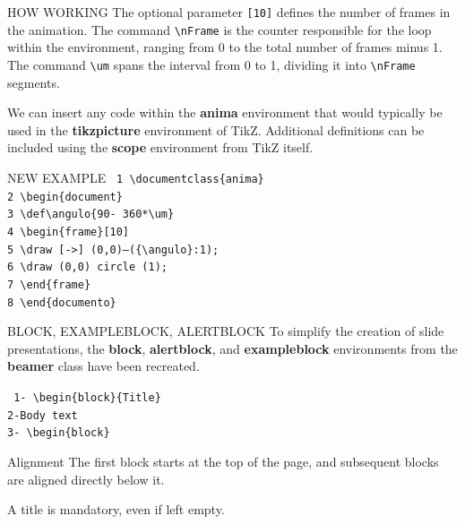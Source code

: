 \documentclass{anima}
\begin{document}
\begin{frame}
\begin{block}{HOW WORKING}
The optional parameter {\tt{\color{animaColor1}[10]}} defines the number of frames in the animation. The command {\tt\textbackslash nFrame} is the counter responsible for the loop within the environment, ranging from 0 to the total number of frames minus 1. The command {\tt{\color{animaColor2}\textbackslash um}} spans the interval from 0 to 1, dividing it into {\tt \textbackslash nFrame} segments.

We can insert any code within the \textbf{anima} environment that would typically be used in the \textbf{tikzpicture} environment of TikZ. Additional definitions can be included using the \textbf{scope} environment from TikZ itself.
\end{block}
\begin{exampleblock}{NEW EXAMPLE}
\tt{%
1 \textbackslash documentclass\{anima\}\\

2 \qquad\textbackslash begin\{document\}\\
3 \qquad\textbackslash def\textbackslash angulo\{90- 360*{\color{animaColor2}\textbackslash um}\}\\
4 \qquad \textbackslash begin\{frame\}{\color{animaColor1}[10]}\\
5 \qquad\qquad\textbackslash draw [->] (0,0)--(\{\textbackslash angulo\}:1);\\
6 \qquad\qquad\textbackslash draw (0,0) circle (1);\\
7 \qquad \textbackslash end\{frame\}\\
8 \textbackslash end\{documento\}}
\end{exampleblock}
\end{frame}

\begin{frame}
\begin{block}{BLOCK, EXAMPLEBLOCK, ALERTBLOCK}
To simplify the creation of slide presentations, the \textbf{block}, \textbf{alertblock}, and \textbf{exampleblock} environments from the \textbf{beamer} class have been recreated.\vspace{.5cm}

{\tt%
1- \textbackslash begin\{block\}\{Title\}\\
2-\qquad Body text\\
3- \textbackslash begin\{block\}\\
}
\end{block}
\begin{alertblock}{Alignment}
The first block starts at the top of the page, and subsequent blocks are aligned directly below it.
\end{alertblock}
\begin{exampleblock}{}
A title is mandatory, even if left empty.
\end{exampleblock}
\end{frame}
\end{document}
